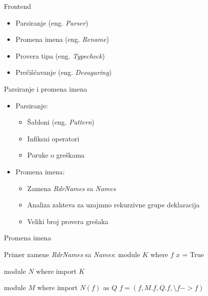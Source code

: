 \documentclass{beamer}
\begin{document}
\begin{frame}{Frontend}
	\begin{itemize}
		\item Parsiranje (eng. \emph{Parser})
		\item Promena imena (eng. \emph{Rename}) 
		\item Provera tipa (eng. \emph{Typecheck})
		\item Prečišćavanje (eng. \emph{Desugaring})
	\end{itemize} 
\end{frame}

\begin{frame}{Parsiranje i promena imena}
	\begin{itemize}
		\item Parsiranje:
		\begin{itemize}
			\item Šabloni (eng. \emph{Pattern})
			\item Infiksni operatori
			\item Poruke o greškama
		\end{itemize}	
	\end{itemize}
	
	\begin{itemize}
		\item Promena imena:
		\begin{itemize}
			\item Zamena \textit{RdrNames} sa \textit{Names}
			\item Analiza zahteva za uzajmno rekurzivne grupe deklaracija
			\item Veliki broj provera grešaka
		\end{itemize}	
	\end{itemize}
	

\end{frame}

\begin{frame}[fragile]{Promena imena}
	
		\begin{block}{Primer zamene \textit{RdrNames} sa \textit{Names}:}
			module $ K $ where
			$ f $ $ x $ = True
			
			module $ N $ where
			import $ K $
			
			module $ M $ where
			import $ N( f ) $ as $ Q $ 
			$f = (f, M.f, Q.f,  \setminus f  -> f) $
		\end{block}

\end{frame}
\end{document}
